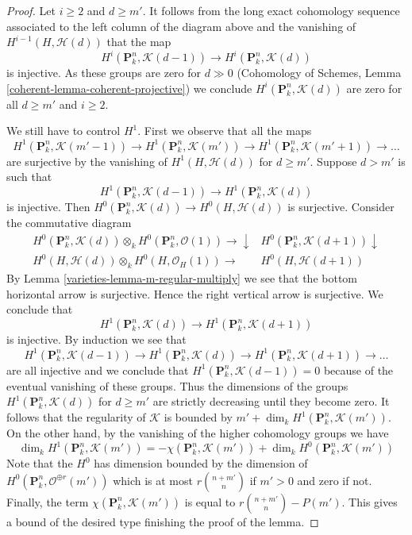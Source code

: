 \begin{proof}
\medskip\noindent
Let $i \geq 2$ and $d \geq m'$. It follows from the long exact
cohomology sequence associated to the left column of the diagram
above and the vanishing of $H^{i - 1}(H, \mathcal{H}(d))$
that the map
$$
H^i(\mathbf{P}^n_k, \mathcal{K}(d - 1))
\longrightarrow
H^i(\mathbf{P}^n_k, \mathcal{K}(d))
$$
is injective. As these groups are zero for $d \gg 0$
(Cohomology of Schemes,
Lemma \ref{coherent-lemma-coherent-projective})
we conclude $H^i(\mathbf{P}^n_k, \mathcal{K}(d))$ are zero
for all $d \geq m'$ and $i \geq 2$.

\medskip\noindent
We still have to control $H^1$. First we observe that all the maps
$$
H^1(\mathbf{P}^n_k, \mathcal{K}(m' - 1)) \to
H^1(\mathbf{P}^n_k, \mathcal{K}(m')) \to
H^1(\mathbf{P}^n_k, \mathcal{K}(m' + 1)) \to \ldots
$$
are surjective by the vanishing of $H^1(H, \mathcal{H}(d))$ for $d \geq m'$.
Suppose $d > m'$ is such that
$$
H^1(\mathbf{P}^n_k, \mathcal{K}(d - 1))
\longrightarrow
H^1(\mathbf{P}^n_k, \mathcal{K}(d))
$$
is injective. Then
$H^0(\mathbf{P}^n_k, \mathcal{K}(d)) \to H^0(H, \mathcal{H}(d))$
is surjective. Consider the commutative diagram
$$
\begin{array}{cc}H^0(\mathbf{P}^n_k, \mathcal{K}(d)) \otimes_k
H^0(\mathbf{P}^n_k, \mathcal{O}(1))
\longrightarrow\downarrow & H^0(\mathbf{P}^n_k, \mathcal{K}(d + 1)) \downarrow \\ H^0(H, \mathcal{H}(d)) \otimes_k
H^0(H, \mathcal{O}_H(1))
\longrightarrow & H^0(H, \mathcal{H}(d + 1))\end{array}
$$
By Lemma \ref{varieties-lemma-m-regular-multiply}
we see that the bottom horizontal arrow is surjective.
Hence the right vertical arrow is surjective. We conclude that
$$
H^1(\mathbf{P}^n_k, \mathcal{K}(d))
\longrightarrow
H^1(\mathbf{P}^n_k, \mathcal{K}(d + 1))
$$
is injective. By induction we see that
$$
H^1(\mathbf{P}^n_k, \mathcal{K}(d - 1)) \to
H^1(\mathbf{P}^n_k, \mathcal{K}(d)) \to
H^1(\mathbf{P}^n_k, \mathcal{K}(d + 1)) \to \ldots
$$
are all injective and we conclude that
$H^1(\mathbf{P}^n_k, \mathcal{K}(d - 1)) = 0$
because of the eventual vanishing of these groups. Thus the dimensions
of the groups $H^1(\mathbf{P}^n_k, \mathcal{K}(d))$ for $d \geq m'$
are strictly decreasing until they become zero. It follows that the
regularity of $\mathcal{K}$ is bounded by
$m' + \dim_k H^1(\mathbf{P}^n_k, \mathcal{K}(m'))$.
On the other hand, by the vanishing of the higher cohomology groups
we have
$$
\dim_k H^1(\mathbf{P}^n_k, \mathcal{K}(m')) =
- \chi(\mathbf{P}^n_k, \mathcal{K}(m')) +
\dim_k H^0(\mathbf{P}^n_k, \mathcal{K}(m'))
$$
Note that the $H^0$ has dimension bounded by the dimension of
$H^0(\mathbf{P}^n_k, \mathcal{O}^{\oplus r}(m'))$ which is
at most $r{n + m' \choose n}$ if $m' > 0$ and zero if not.
Finally, the term $\chi(\mathbf{P}^n_k, \mathcal{K}(m'))$ is equal
to $r{n + m' \choose n} - P(m')$. This gives a bound of the
desired type finishing the proof of the lemma.
\end{proof}

